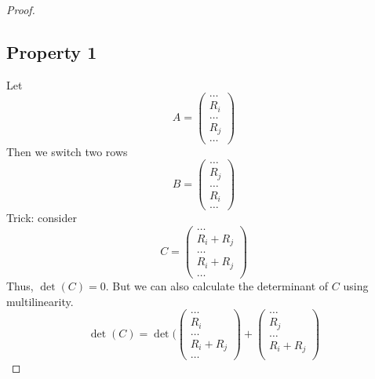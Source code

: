 \documentclass{article}
\newtheorem{one minute paper}[theorem]{One Minute Paper}
\begin{document}
\begin{proof}
    \subsection*{Property 1}
    Let 
    \begin{equation}
        A = \begin{pmatrix}
            \dots \\
            R_i \\
            \dots \\
            R_j\\
            \dots
        \end{pmatrix}
    \end{equation}
    Then we switch two rows 
    \begin{equation}
        B = \begin{pmatrix}
            \dots \\
            R_j \\
            \dots \\
            R_i\\
            \dots
        \end{pmatrix}
    \end{equation}
    Trick: consider 
    \begin{equation}
        C = \begin{pmatrix}
            \dots \\
            R_i + R_j \\
            \dots \\
            R_i + R_j\\
            \dots
        \end{pmatrix}
    \end{equation}
    Thus, $\det(C) = 0$. But we can also calculate the determinant of $C$ using multilinearity. 
    \begin{equation}
        \det(C) = \det(\begin{pmatrix}
            \dots \\
            R_i\\
            \dots \\
            R_i + R_j\\
            \dots
        \end{pmatrix} + \begin{pmatrix}
            \dots \\
            R_j\\
            \dots \\
            R_i + R_j\\

\end{pmatrix}
\end{equation}
\end{proof}
\end{document}
